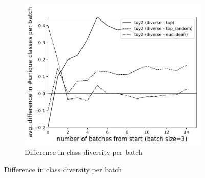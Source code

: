 \documentclass{article} %
\begin{document}
\begin{figure}
	\begin{subfigure}[b]{0.48\textwidth}
		\includegraphics[width=\textwidth]{results_diff_classes_toy2}
		\caption{Difference in class diversity per batch}
		\label{fig:class_diff}
	\end{subfigure}

\end{figure}
\end{document}
